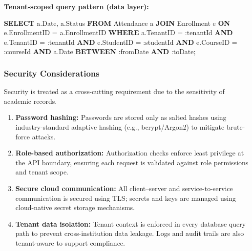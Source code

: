 \documentclass[11pt]{article}
\newenvironment{Shaded}{}{}
\newcommand{\CharTok}[1]{\textcolor[rgb]{0.25,0.44,0.63}{#1}}
\newcommand{\DataTypeTok}[1]{\textcolor[rgb]{0.56,0.13,0.00}{#1}}
\newcommand{\KeywordTok}[1]{\textcolor[rgb]{0.00,0.44,0.13}{\textbf{#1}}}
\newcommand{\NormalTok}[1]{#1}
\newcommand{\OperatorTok}[1]{\textcolor[rgb]{0.40,0.40,0.40}{#1}}
\providecommand{\tightlist}{%
  \setlength{\itemsep}{0pt}\setlength{\parskip}{0pt}}
\begin{document}
\textbf{Tenant-scoped query pattern (data layer):}

\begin{Shaded}
\begin{Highlighting}[]
\KeywordTok{SELECT}\NormalTok{  a.}\DataTypeTok{Date}\NormalTok{, a.Status}
\KeywordTok{FROM}\NormalTok{    Attendance a}
\KeywordTok{JOIN}\NormalTok{    Enrollment e }\KeywordTok{ON}\NormalTok{ e.EnrollmentID }\OperatorTok{=}\NormalTok{ a.EnrollmentID}
\KeywordTok{WHERE}\NormalTok{   a.TenantID }\OperatorTok{=} \CharTok{:tenantId}
  \KeywordTok{AND}\NormalTok{   e.TenantID }\OperatorTok{=} \CharTok{:tenantId}
  \KeywordTok{AND}\NormalTok{   e.StudentID }\OperatorTok{=} \CharTok{:studentId}
  \KeywordTok{AND}\NormalTok{   e.CourseID }\OperatorTok{=} \CharTok{:courseId}
  \KeywordTok{AND}\NormalTok{   a.}\DataTypeTok{Date} \KeywordTok{BETWEEN} \CharTok{:fromDate} \KeywordTok{AND} \CharTok{:toDate}\NormalTok{;}
\end{Highlighting}
\end{Shaded}

\subsubsection{Security Considerations}\label{security-considerations}

Security is treated as a cross-cutting requirement due to the
sensitivity of academic records.

\begin{enumerate}
\def\labelenumi{\arabic{enumi}.}
\tightlist
\item
  \textbf{Password hashing:} Passwords are stored only as salted hashes
  using industry-standard adaptive hashing (e.g., bcrypt/Argon2) to
  mitigate brute-force attacks.
\item
  \textbf{Role-based authorization:} Authorization checks enforce least
  privilege at the API boundary, ensuring each request is validated
  against role permissions and tenant scope.
\item
  \textbf{Secure cloud communication:} All client--server and
  service-to-service communication is secured using TLS; secrets and
  keys are managed using cloud-native secret storage mechanisms.
\item
  \textbf{Tenant data isolation:} Tenant context is enforced in every
  database query path to prevent cross-institution data leakage. Logs
  and audit trails are also tenant-aware to support compliance.
\end{enumerate}
\end{document}
